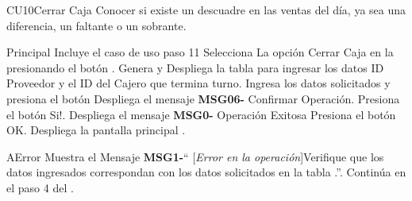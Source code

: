 \begin{UseCase}{CU10}{Cerrar Caja}{
		Conocer si existe un descuadre en las ventas del día, ya sea una diferencia, un faltante o un sobrante.
	}
	\end{UseCase}
	\begin{UCtrayectoria}{Principal}
		\UCpaso Incluye el caso de uso  paso 11
		\UCpaso[\UCactor] Selecciona La opción Cerrar Caja en la  presionando el botón .
		\UCpaso Genera y Despliega la tabla   para ingresar los datos ID Proveedor y el ID del Cajero que termina turno. 
		\UCpaso [\UCactor] Ingresa los datos solicitados y presiona el botón  
		\UCpaso Despliega el mensaje {\bf MSG06-} {Confirmar Operación}. 
		\UCpaso [\UCactor] Presiona el botón {Si!}.
		\UCpaso Despliega el mensaje {\bf MSG0-} {Operación Exitosa}
		\UCpaso [\UCactor] Presiona el botón {OK}.
		\UCpaso Despliega la pantalla principal .
	\end{UCtrayectoria}


\begin{UCtrayectoriaA}{A}{Error}
			\UCpaso Muestra el Mensaje {\bf MSG1-}`` [{\em Error en la operación}]Verifique que los datos ingresados correspondan con los datos solicitados en la tabla .''.
			\UCpaso Continúa en el paso 4 del .
		\end{UCtrayectoriaA}
